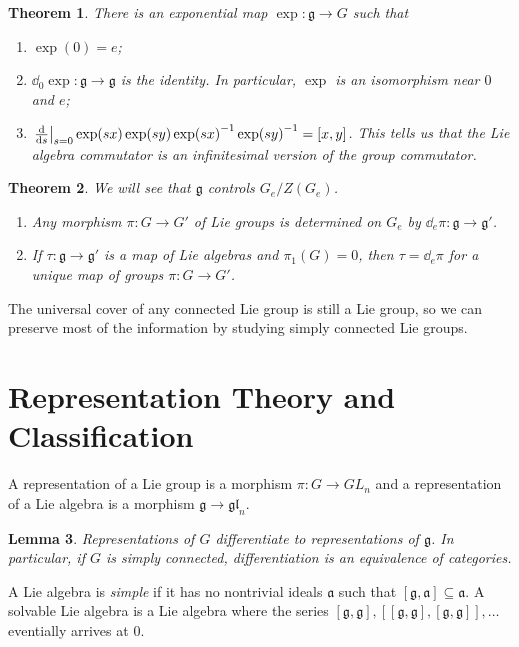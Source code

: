 \documentclass[leqno, openany]{memoir}
\newtheorem{thm}{Theorem}[chapter]
\newtheorem{lem}[thm]{Lemma}
\theoremstyle{definition}
\theoremstyle{remark}
\theoremstyle{plain}
\theoremstyle{definition}
\theoremstyle{remark}
\newcommand{\mf}[1]{\mathfrak{#1}}
\begin{document}
\begin{thm}
    There is an exponential map $\exp: \mf{g} \to G$ such that
    \begin{enumerate}
        \item $\exp(0) = e$;
        \item $\dd_0 \exp: \mf{g} \to \mf{g}$ is the identity. In particular, $\exp$ is an isomorphism near $0$ and $e$;
        \item $\eval{\dv{s}}_{s=0} \exp(sx) \exp(sy) \exp(sx)^{-1} \exp(sy)^{-1} = [x,y]$. This tells us that the Lie algebra commutator is an infinitesimal version of the group commutator.
    \end{enumerate}
\end{thm}

\begin{thm}
    We will see that $\mf{g}$ controls $G_e / Z(G_e)$.
    \begin{enumerate}
        \item Any morphism $\pi: G \to G'$ of Lie groups is determined on $G_e$ by $\dd_e \pi: \mf{g} \to \mf{g}'$.
        \item If $\tau: \mf{g} \to \mf{g}'$ is a map of Lie algebras and $\pi_1(G) = 0$, then $\tau = \dd_e \pi$ for a unique map of groups $\pi: G \to G'$.
    \end{enumerate}
\end{thm}

The universal cover of any connected Lie group is still a Lie group, so we can preserve most of the information by studying simply connected Lie groups.

\section{Representation Theory and Classification}%
\label{sec:representation_theory_and_classification}

A representation of a Lie group is a morphism $\pi: G \to GL_n$ and a representation of a Lie algebra is a morphism $\mf{g} \to \mf{gl}_n$.

\begin{lem}
    Representations of $G$ differentiate to representations of $\mf{g}$. In particular, if $G$ is simply connected, differentiation is an equivalence of categories.
\end{lem}

A Lie algebra is \textit{simple} if it has no nontrivial ideals $\mf{a}$ such that $[\mf{g}, \mf{a}] \subseteq \mf{a}$. A solvable Lie algebra is a Lie algebra where the series $[\mf{g}, \mf{g}], [[\mf{g}, \mf{g}], [\mf{g}, \mf{g}]], \ldots$ eventially arrives at $0$.
\end{document}

